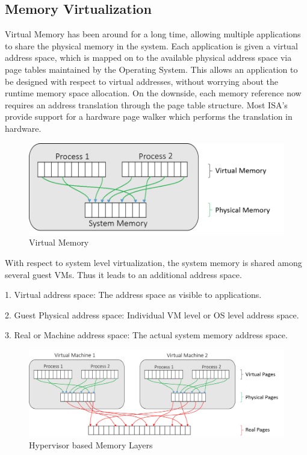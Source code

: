 \subsection{Memory Virtualization}
Virtual Memory has been around for a long time, allowing multiple applications to share the physical memory in the system. Each application is given a virtual address space, which is mapped on to the available physical address space via page tables maintained by the Operating System. This allows an application to be designed with respect to virtual addresses, without worrying about the runtime memory space allocation. On the downside, each memory reference now requires an address translation through the page table structure. Most ISA’s provide support for a hardware page walker which performs the translation in hardware. 


\setlength{\belowcaptionskip}{-10pt}

\begin{figure}[H]
  \centering
  \includegraphics[scale=0.6]{figures/virt_mem.png}
  \caption{Virtual Memory}
  \label{fig:virt_mem}
\end{figure}

With respect to system level virtualization, the system memory is shared among several guest VMs. Thus it leads to an additional address space. 

1. Virtual address space: The address space as visible to applications.

2. Guest Physical address space: Individual VM level or OS level address space.

3. Real or Machine address space: The actual system memory address space. 


\setlength{\belowcaptionskip}{-10pt}

\begin{figure}[H]
  \centering
  \includegraphics[scale=0.6]{figures/hyp_mem_map_comp.png}
  \caption{Hypervisor based Memory Layers}
  \label{fig:hyper_mem}
\end{figure}

